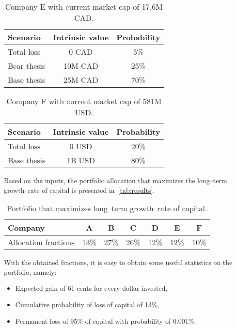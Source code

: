 \documentclass{article}
\begin{document}
\begin{table}[!ht]
\caption{Company E with current market cap of 17.6M CAD.}
\vspace{0.25cm}
\centering
\begin{tabular}{l|c|c}
Scenario & Intrinsic value & Probability \\
\hline
Total loss & 0 CAD & 5\% \\
Bear thesis & 10M CAD & 25\% \\
Base thesis & 25M CAD & 70\% \\
\end{tabular}%
\label{tab:companyE}%
\end{table}%

\begin{table}[!ht]
\caption{Company F with current market cap of 581M USD.}
\vspace{0.25cm}
\centering
\begin{tabular}{l|c|c}
Scenario & Intrinsic value & Probability \\
\hline
Total loss & 0 USD & 20\% \\
Base thesis & 1B USD & 80\% \\
\end{tabular}%
\label{tab:companyF}%
\end{table}%


\noindent Based on the inputs, the portfolio allocation that maximizes the
long--term growth--rate of capital is presented in~\autoref{tab:results}.

\begin{table}
\caption{Portfolio that maximizes long--term growth--rate of capital.}
\vspace{0.25cm}
\centering
\begin{tabular}{l|c|c|c|c|c|c}
Company & A & B & C & D & E & F \\
\hline
Allocation fractions & 13\% & 27\% & 26\% & 12\% & 12\% & 10\% \\
\end{tabular}%
\label{tab:results}%
\end{table}%

With the obtained fractions, it is easy to obtain some useful
statistics on the portfolio, namely:
\begin{itemize}
    \item Expected gain of 61 cents for every dollar invested,
    \item Cumulative probability of loss of capital of 13\%,
    \item Permanent loss of 95\% of capital with probability of 0.001\%.
\end{itemize}
\end{document}

